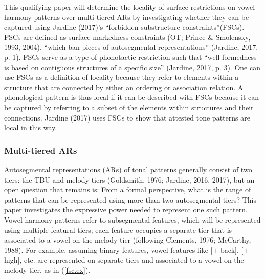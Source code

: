 \documentclass[floatsintext,man]{apa6}
\theoremstyle{definition}
\theoremstyle{definition}
\theoremstyle{definition}
\theoremstyle{remark}
\begin{document}
This qualifying paper will determine the locality of surface
restrictions on vowel harmony patterns over multi-tiered ARs by
investigating whether they can be captured using Jardine (2017)'s
\enquote{forbidden substructure constraints}(FSCs). FSCs are defined as
surface markedness constraints (OT; Prince \& Smolensky, 1993, 2004),
\enquote{which ban pieces of autosegmental representations} (Jardine,
2017, p. 1). FSCs serve as a type of phonotactic restriction such that
\enquote{well-formedness is based on contiguous structures of a specific
size} (Jardine, 2017, p. 3). One can use FSCs as a definition of
locality because they refer to elements within a structure that are
connected by either an ordering or association relation. A phonological
pattern is thus local if it can be described with FSCs because it can be
captured by referring to a subset of the elements within structures and
their connections. Jardine (2017) uses FSCs to show that attested tone
patterns are local in this way.

\subsubsection{Multi-tiered ARs}\label{multi-tiered-ars}

Autosegmental representations (ARs) of tonal patterns generally consist
of two tiers: the TBU and melody tiers (Goldsmith, 1976; Jardine, 2016,
2017), but an open question that remains is: From a formal perspective,
what is the range of patterns that can be represented using more than
two autosegmental tiers? This paper investigates the expressive power
needed to represent one such pattern. Vowel harmony patterns refer to
subsegmental features, which will be represented using multiple featural
tiers; each feature occupies a separate tier that is associated to a
vowel on the melody tier (following Clements, 1976; McCarthy, 1988). For
example, assuming binary features, vowel features like {[}\(\pm\)
back{]}, {[}\(\pm\) high{]}, etc. are represented on separate tiers and
associated to a vowel on the melody tier, as in (\ref{fsc.ex}).

\begin{exe}
\ex \label{fsc.ex}
\end{exe}
\end{document}

